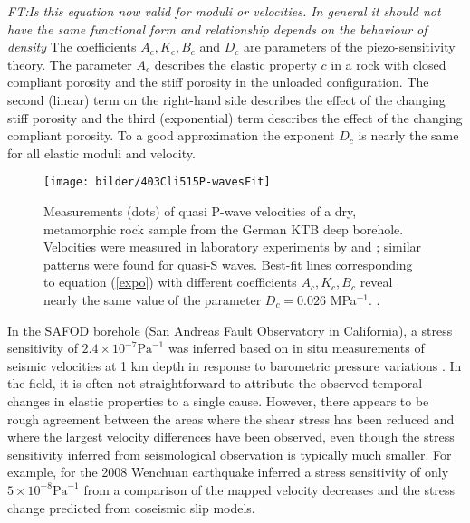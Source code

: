 \documentclass[11pt]{article}
\newcommand{\noteft}[1]{{\it \color{magenta} FT:#1}}
\newcommand{\noteft}[1]{}
\begin{document}
\begin{description}
\begin{equation}
\label{expo}
\end{equation}
\noteft{Is this equation now valid for moduli or velocities. In general it should not have the same functional form and relationship depends on the behaviour of density}
The  coefficients $A_c, K_c, B_c$ and
$D_c$ %
are parameters of the piezo-sensitivity
theory. The parameter $A_c$ describes the elastic property $c$ in a rock 
with closed compliant porosity and the stiff porosity in the unloaded 
configuration. The second (linear) term on the right-hand side describes 
the effect of the changing stiff porosity and the third (exponential) 
term describes the effect of the changing compliant porosity. To a good 
approximation the exponent $D_c$ is nearly the same for all elastic 
moduli and velocity.

\begin{SCfigure}%
         \centering
 \texttt{[image: bilder/403Cli515P-wavesFit]}
            \caption{\footnotesize Measurements (dots) of quasi P-wave velocities %
    of a dry, metamorphic rock sample from the German KTB deep borehole.
    Velocities were measured %
    in laboratory experiments by \citet{Kern90} and \citet{Kern91}; similar patterns were found for quasi-S waves.
    Best-fit lines corresponding to equation (\ref{expo})
    with different coefficients $A_c, K_c, B_c$
    reveal nearly the same
      value of the parameter $D_c = 0.026$ MPa$^{-1}$. \citep[After][]{shapiroKaselow2005}.}
                   \label{fig_ktb_velocities}
	        \end{SCfigure}
	        
In the SAFOD borehole (San Andreas Fault Observatory in California), a stress sensitivity of $2.4\!\times\!10^{-7} \mbox{Pa}^{-1}$ was inferred based on in situ measurements of seismic velocities at 1 km depth in response to barometric pressure variations \citep{niu08}. In the field, it is often not straightforward to attribute the observed temporal changes in elastic properties to a single cause. However, there appears to be rough agreement between the areas where the shear stress has been reduced and where the largest velocity differences have been observed, even though the stress sensitivity inferred from seismological observation is typically much smaller. For example, for the 2008 Wenchuan earthquake \citet{chen10_grl} inferred a stress sensitivity of only $5\!\times\!10^{-8}\mbox{Pa}^{-1}$ from a comparison of the mapped velocity decreases and the stress change predicted from coseismic slip models.


\end{description}
\end{document}
